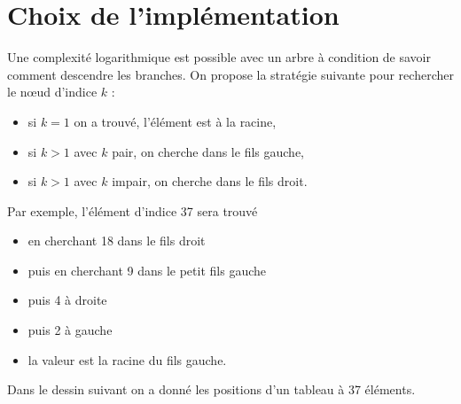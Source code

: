 \section{Choix de l'implémentation}
Une complexité logarithmique est possible avec un arbre à condition de savoir comment descendre les branches. On propose la stratégie suivante pour rechercher le nœud d'indice $k$ :

\begin{itemize}
    \item si $k=1$ on a trouvé, l'élément est à la racine,
    \item si $k>1$ avec $k$ pair, on cherche  dans le fils gauche,
    \item si $k>1$ avec $k$ impair, on cherche  dans le fils droit.
\end{itemize}

Par exemple, l'élément d'indice 37 sera trouvé 
\begin{itemize}
    \item en cherchant 18 dans le fils droit
    \item puis en cherchant 9 dans le petit fils gauche
    \item puis 4 à droite
    \item puis 2 à gauche
    \item la valeur est la racine du fils gauche.
\end{itemize}

Dans le dessin suivant on a donné les positions d'un tableau à 37 éléments.

